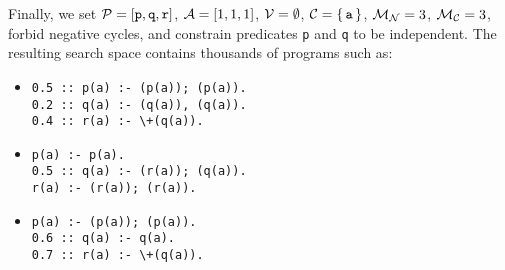 Finally, we set $\mathcal{P}{} = [\texttt{p}, \texttt{q}, \texttt{r}]$,
$\mathcal{A}{} = [1, 1, 1]$, $\mathcal{V}{} = \emptyset$,
$\mathcal{C}{} = \{\, \texttt{a} \,\}$, $\mathcal{M}_{\mathcal{N}}{} = 3$,
$\mathcal{M}_{\mathcal{C}}{} = 3$, forbid negative cycles, and constrain predicates
\texttt{p} and \texttt{q} to be independent. The resulting search space contains
thousands of programs such as:

\begin{itemize}
\item
\begin{verbatim}
0.5 :: p(a) :- (p(a)); (p(a)).
0.2 :: q(a) :- (q(a)), (q(a)).
0.4 :: r(a) :- \+(q(a)).
\end{verbatim}
\item
\begin{verbatim}
p(a) :- p(a).
0.5 :: q(a) :- (r(a)); (q(a)).
r(a) :- (r(a)); (r(a)).
\end{verbatim}
\item
\begin{verbatim}
p(a) :- (p(a)); (p(a)).
0.6 :: q(a) :- q(a).
0.7 :: r(a) :- \+(q(a)).
\end{verbatim}
\end{itemize}
